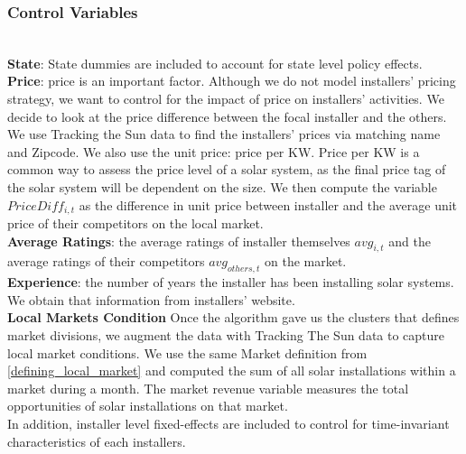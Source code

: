 \documentclass[msom,blindrev]{informs3}
\begin{document}
\subsubsection{Control Variables}\hfill\\
\textbf{State}: State dummies are included to account for state level policy effects. \\
\textbf{Price}: price is an important factor. Although we do not model installers' pricing strategy, we want to control for the impact of price on installers' activities. We decide to look at the price difference between the focal installer and the others. We use Tracking the Sun data to find the installers' prices via matching name and Zipcode. We also use the unit price: price per KW. Price per KW is a common way to assess the price level of a solar system, as the final price tag of the solar system will be dependent on the size. We then compute the variable $PriceDiff_{i,t}$ as the difference in unit price between installer and the average unit price of their competitors on the local market. \\
\textbf{Average Ratings}: the average ratings of installer themselves $avg_{i,t}$ and the average ratings of their competitors $avg_{others,t}$ on the market. \\
\textbf{Experience}: the number of years the installer has been installing solar systems. We obtain that information from installers' website. \\
\textbf{Local Markets Condition} Once the algorithm gave us the clusters that defines market divisions, we augment the data with Tracking The Sun data to capture local market conditions. We use the same Market definition from \ref{defining_local_market} and computed the sum of all solar installations within a market during a month. The market revenue variable measures the total opportunities of solar installations on that market. \\
In addition, installer level fixed-effects are included to control for time-invariant characteristics of each installers.
\end{document}
